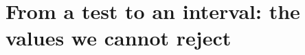 \providecommand{\FourAWkChiNinetynine}{}\renewcommand{\FourAWkChiNinetynine}{6.635}
\providecommand{\FourAWkMeanOne}{}\renewcommand{\FourAWkMeanOne}{1.002}
\providecommand{\FourAWkMeanTwo}{}\renewcommand{\FourAWkMeanTwo}{2.003}
\providecommand{\FourAWkVarOne}{}\renewcommand{\FourAWkVarOne}{2.011}
\providecommand{\FourAWkVarTwo}{}\renewcommand{\FourAWkVarTwo}{3.995}
\providecommand{\FourAWkZeroSmall}{}\renewcommand{\FourAWkZeroSmall}{0.603}
\providecommand{\FourAWkZeroBig}{}\renewcommand{\FourAWkZeroBig}{0.527}
\providecommand{\FourAWkThreeSmall}{}\renewcommand{\FourAWkThreeSmall}{0.001769}
\providecommand{\FourAWkThreeBig}{}\renewcommand{\FourAWkThreeBig}{0.001262}
\providecommand{\FourAWkThreeTh}{}\renewcommand{\FourAWkThreeTh}{0.00135}
\providecommand{\FourAWkZwilks}{}\renewcommand{\FourAWkZwilks}{3.40}
\providecommand{\FourAWkZexact}{}\renewcommand{\FourAWkZexact}{3.29}
\providecommand{\FourAWkZAsmall}{}\renewcommand{\FourAWkZAsmall}{2.33}
\providecommand{\FourAWkZsbSmall}{}\renewcommand{\FourAWkZsbSmall}{2.80}
\providecommand{\FourAWkZAbig}{}\renewcommand{\FourAWkZAbig}{0.984}
\providecommand{\FourAWkZsbBig}{}\renewcommand{\FourAWkZsbBig}{1.000}
\providecommand{\FourAWkZmedBig}{}\renewcommand{\FourAWkZmedBig}{0.984}
\providecommand{\ThreeBProfNon}{}\renewcommand{\ThreeBProfNon}{20}
\providecommand{\ThreeBProfNoff}{}\renewcommand{\ThreeBProfNoff}{8}
\providecommand{\ThreeBProfK}{}\renewcommand{\ThreeBProfK}{1}
\providecommand{\ThreeBProfS}{}\renewcommand{\ThreeBProfS}{12}
\providecommand{\ThreeBProfB}{}\renewcommand{\ThreeBProfB}{8}
\providecommand{\ThreeBProfLo}{}\renewcommand{\ThreeBProfLo}{5.192}
\providecommand{\ThreeBProfHi}{}\renewcommand{\ThreeBProfHi}{5.47}
\providecommand{\ThreeBCondLo}{}\renewcommand{\ThreeBCondLo}{4.145}
\providecommand{\ThreeBCondHi}{}\renewcommand{\ThreeBCondHi}{4.811}
\providecommand{\ThreeBProfGauss}{}\renewcommand{\ThreeBProfGauss}{5.292}
\providecommand{\ThreeBCondGauss}{}\renewcommand{\ThreeBCondGauss}{4.472}
\providecommand{\ThreeBProfCover}{}\renewcommand{\ThreeBProfCover}{0.6849}
\providecommand{\ThreeBCondCover}{}\renewcommand{\ThreeBCondCover}{0.6088}
\providecommand{\ThreeBProfUsed}{}\renewcommand{\ThreeBProfUsed}{9995}
 
\section{From a test to an interval: the values we cannot reject}
\label{4b:sec:inversion}

